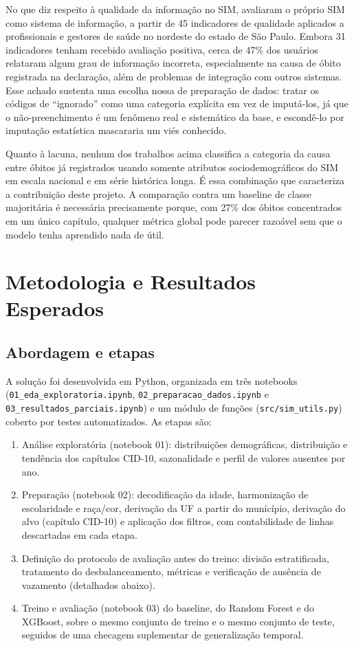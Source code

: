 \documentclass[12pt]{article}
\begin{document}
No que diz respeito à qualidade da informação no SIM, \cite{morais2017} avaliaram o próprio SIM como sistema de informação, a partir de 45 indicadores de qualidade aplicados a profissionais e gestores de saúde no nordeste do estado de São Paulo. Embora 31 indicadores tenham recebido avaliação positiva, cerca de 47\% dos usuários relataram algum grau de informação incorreta, especialmente na causa de óbito registrada na declaração, além de problemas de integração com outros sistemas. Esse achado sustenta uma escolha nossa de preparação de dados: tratar os códigos de ``ignorado'' como uma categoria explícita em vez de imputá-los, já que o não-preenchimento é um fenômeno real e sistemático da base, e escondê-lo por imputação estatística mascararia um viés conhecido.

Quanto à lacuna, nenhum dos trabalhos acima classifica a categoria da causa entre óbitos já registrados usando somente atributos sociodemográficos do SIM em escala nacional e em série
histórica longa. É essa combinação que caracteriza a contribuição deste projeto. A comparação contra um baseline de classe majoritária é necessária precisamente porque, com 27\% dos óbitos concentrados em um único capítulo, qualquer métrica global pode parecer razoável sem que o modelo tenha aprendido nada de útil.

\section{Metodologia e Resultados Esperados}
\label{sec:metodologia}

\subsection{Abordagem e etapas}

A solução foi desenvolvida em Python, organizada em três notebooks
(\texttt{01\_eda\_exploratoria.ipynb}, \texttt{02\_preparacao\_dados.ipynb} e
\texttt{03\_resultados\_parciais.ipynb}) e um módulo de funções
(\texttt{src/sim\_utils.py}) coberto por testes automatizados. As etapas são:

\begin{enumerate}
  \item Análise exploratória (notebook 01): distribuições
    demográficas, distribuição e tendência dos capítulos CID-10, sazonalidade e perfil de valores ausentes por ano.
  \item Preparação (notebook 02): decodificação da idade,
    harmonização de escolaridade e raça/cor, derivação da UF a partir do
    município, derivação do alvo (capítulo CID-10) e aplicação dos filtros,
    com contabilidade de linhas descartadas em cada etapa.
  \item Definição do protocolo de avaliação antes do treino: divisão
    estratificada, tratamento do desbalanceamento, métricas e verificação de
    ausência de vazamento (detalhados abaixo).
  \item Treino e avaliação (notebook 03) do baseline, do Random
    Forest e do XGBoost, sobre o mesmo conjunto de treino e o mesmo conjunto
    de teste, seguidos de uma checagem suplementar de generalização temporal.
\end{enumerate}
\end{document}
